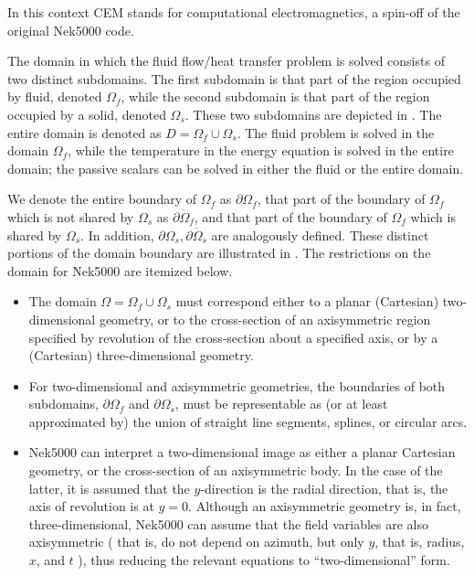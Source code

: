 \documentclass[letterpaper,10pt,english]{sphinxmanual}
\begin{document}
In this context CEM stands for computational electromagnetics, a spin-off of the original Nek5000 code.

The domain in which the fluid flow/heat transfer
problem is solved consists of two distinct subdomains. The
first subdomain is that part of the region occupied by
fluid, denoted \(\Omega_f\), while the second subdomain is that part
of the region occupied by a solid, denoted \(\Omega_s\). These two
subdomains are depicted in . The entire domain is denoted as \(D=\Omega_f \cup \Omega_s\).
The fluid problem is solved in the domain \(\Omega_f\), while the
temperature in the energy equation is solved in the
entire domain; the passive scalars can be solved in either
the fluid or the entire domain.

We denote the entire boundary of \(\Omega_f\) as \(\partial \Omega_f\), that part
of the boundary of \(\Omega_f\) which is not shared by \(\Omega_s\) as
\(\overline{\partial \Omega_f}\), and
that part of the boundary of \(\Omega_f\) which is shared by \(\Omega_s\).
In addition, \(\partial \Omega_{s}, \overline{\partial \Omega_s}\) are analogously defined.
These distinct portions of the
domain boundary are illustrated in .
The restrictions on the domain for Nek5000 are itemized below.
\begin{itemize}
\item {} 
The domain \(\Omega=\Omega_f \cup \Omega_s\) must correspond either to a
planar (Cartesian) two-dimensional geometry, or to the
cross-section of an axisymmetric region specified by
revolution of the cross-section about a specified axis, or
by a (Cartesian) three-dimensional geometry.

\item {} 
For two-dimensional and axisymmetric geometries, the
boundaries of both subdomains, \(\partial \Omega_f\) and
\(\partial \Omega_s\), must be
representable as (or at least approximated by) the union of
straight line segments, splines, or circular arcs.

\item {} 
Nek5000 can interpret a two-dimensional image as either
a planar Cartesian geometry, or
the cross-section of an axisymmetric body. In the case of
the latter, it is assumed that the \(y\)-direction is the radial
direction, that is, the axis of revolution is at \(y=0\).
Although an axisymmetric geometry is, in fact,
three-dimensional, Nek5000 can assume that the field variables
are also axisymmetric ( that is, do not depend on azimuth,
but only \(y\), that is, radius, \(x\), and \(t\) ), thus reducing the
relevant equations to “two-dimensional” form.

\end{itemize}
\end{document}
